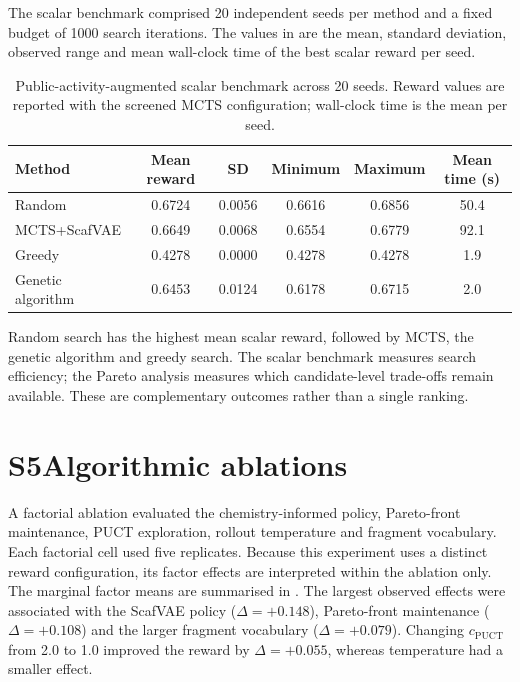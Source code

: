 \documentclass[10pt,a4paper]{article}
\begin{document}
The scalar benchmark comprised \num{20} independent seeds per method and a
fixed budget of \num{1000} search iterations. The values in
 are the mean, standard deviation, observed range and
mean wall-clock time of the best scalar reward per seed.

\begin{table}[htbp]
  \centering
  \caption{Public-activity-augmented scalar benchmark across \num{20} seeds.
  Reward values are reported with the screened MCTS configuration; wall-clock
time is the mean per seed.}
  \label{tab:sm_benchmark}
  \begin{tabular}{lccccc}
    \toprule
    Method & Mean reward & SD & Minimum & Maximum & Mean time (s) \\
    \midrule
    Random        & \num{0.6724} & \num{0.0056} & \num{0.6616} & \num{0.6856} & \num{50.4} \\
    MCTS+ScafVAE  & \num{0.6649} & \num{0.0068} & \num{0.6554} & \num{0.6779} & \num{92.1} \\
    Greedy        & \num{0.4278} & \num{0.0000} & \num{0.4278} & \num{0.4278} & \num{1.9} \\
    Genetic algorithm & \num{0.6453} & \num{0.0124} & \num{0.6178} & \num{0.6715} & \num{2.0} \\
    \bottomrule
  \end{tabular}
\end{table}Random search has the highest mean scalar reward, followed by MCTS, the genetic algorithm and greedy search. The scalar benchmark measures search efficiency; the Pareto analysis measures which candidate-level trade-offs remain available. These are complementary outcomes rather than a single ranking.

\section*{S5\hspace{0.6em}Algorithmic ablations}

A factorial ablation evaluated the chemistry-informed policy, Pareto-front maintenance, PUCT exploration, rollout temperature and fragment vocabulary. Each factorial cell used five replicates. Because this experiment uses a distinct reward configuration, its factor effects are interpreted within the ablation only. The marginal factor means are summarised in
. The largest observed effects were associated
with the ScafVAE policy ($\Delta=+\num{0.148}$), Pareto-front maintenance
($\Delta=+\num{0.108}$) and the larger fragment vocabulary
($\Delta=+\num{0.079}$). Changing $c_{\mathrm{PUCT}}$ from \num{2.0} to
\num{1.0} improved the reward by $\Delta=+\num{0.055}$, whereas temperature
had a smaller effect.
\end{document}
